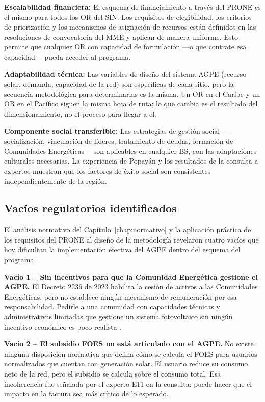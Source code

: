 \textbf{Escalabilidad financiera:} El esquema de financiamiento a
través del PRONE es el mismo para todos los OR del SIN. Los requisitos
de elegibilidad, los criterios de priorización y los mecanismos de
asignación de recursos están definidos en las resoluciones de
convocatoria del MME y aplican de manera uniforme. Esto permite que
cualquier OR con capacidad de formulación —o que contrate esa capacidad—
pueda acceder al programa.

\textbf{Adaptabilidad técnica:} Las variables de diseño del sistema
AGPE (recurso solar, demanda, capacidad de la red) son específicas de
cada sitio, pero la secuencia metodológica para determinarlas es la
misma. Un OR en el Caribe y un OR en el Pacífico siguen la misma hoja
de ruta; lo que cambia es el resultado del dimensionamiento, no el
proceso para llegar a él.

\textbf{Componente social transferible:} Las estrategias de gestión
social —socialización, vinculación de líderes, tratamiento de deudas,
formación de Comunidades Energéticas— son aplicables en cualquier BS,
con las adaptaciones culturales necesarias. La experiencia de Popayán
\parencite{SerranoRueda2019} y los resultados de la consulta a expertos
muestran que los factores de éxito social son consistentes
independientemente de la región.

\subsection{Vacíos regulatorios identificados}
\label{subsec:vacios_regulatorios}

El análisis normativo del Capítulo~\ref{chap:normativo} y la aplicación
práctica de los requisitos del PRONE al diseño de la metodología
revelaron cuatro vacíos que hoy dificultan la implementación efectiva
del AGPE dentro del esquema del programa.

\textbf{Vacío 1 -- Sin incentivos para que la Comunidad Energética
gestione el AGPE.} El Decreto 2236 de 2023 habilita la cesión de
activos a las Comunidades Energéticas, pero no establece ningún
mecanismo de remuneración por esa responsabilidad. Pedirle a una
comunidad con capacidades técnicas y administrativas limitadas que
gestione un sistema fotovoltaico sin ningún incentivo económico es
poco realista \parencite{Decreto2236_2023}.

\textbf{Vacío 2 -- El subsidio FOES no está articulado con el AGPE.}
No existe ninguna disposición normativa que defina cómo se calcula el
FOES para usuarios normalizados que cuentan con generación solar. El
usuario reduce su consumo neto de la red, pero el subsidio se calcula
sobre el consumo total. Esa incoherencia fue señalada por el experto
E11 en la consulta: puede hacer que el impacto en la factura sea más
crítico de lo esperado.

